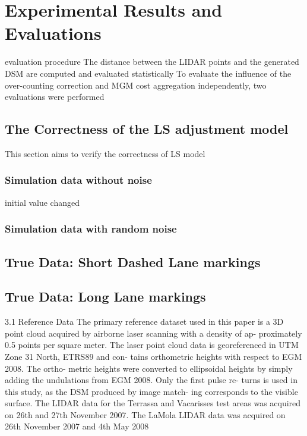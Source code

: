 
\chapter{Experimental Results and Evaluations}
\label{chap:k3}

evaluation procedure
The distance between the LIDAR points and the generated DSM are computed and evaluated statistically
To evaluate the influence of the over-counting correction and MGM
cost aggregation independently, two evaluations were performed






\section{The Correctness of the LS adjustment model}

This section aims to verify the correctness of LS model

\subsection{Simulation data without noise}
initial value changed

\subsection{Simulation data with random noise}




\section{True Data: Short Dashed Lane markings}



\section{True Data: Long Lane markings}


3.1  Reference Data
The primary reference dataset used in this paper is a 3D point
cloud acquired by airborne laser scanning with a density of ap-
proximately 0.5 points per square meter.  The laser point cloud
data is georeferenced in UTM Zone 31 North, ETRS89 and con-
tains orthometric heights with respect to EGM 2008.  The ortho-
metric  heights  were  converted  to  ellipsoidal  heights  by  simply
adding the undulations from EGM 2008.  Only the first pulse re-
turns is used in this study, as the DSM produced by image match-
ing corresponds to the visible surface.  The LIDAR data for the
Terrassa and Vacarisses test areas was acquired on 26th and 27th
November 2007. The LaMola LIDAR data was acquired on 26th
November 2007 and 4th May 2008



